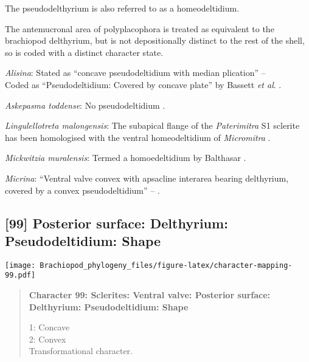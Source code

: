 \documentclass[openany]{book}
\theoremstyle{definition}
\theoremstyle{definition}
\theoremstyle{definition}
\theoremstyle{remark}
\begin{document}
The pseudodelthyrium is also referred to as a homeodeltidium.

The antemucronal area of polyplacophora is treated as equivalent to the
brachiopod delthyrium, but is not depositionally distinct to the rest of
the shell, so is coded with a distinct character state.

\hypertarget{Alisina-coding-98}{}
\emph{Alisina}: Stated as ``concave pseudodeltidium with median
plication'' -- \citet{Williams2000LinguliformeaCraniiformea}\\
Coded as ``Pseudodeltidium: Covered by concave plate'' by Bassett
\emph{et al}. \citeyearpar{Bassett2001Functionalmorphology}.

\hypertarget{Askepasma_toddense-coding-98}{}
\emph{Askepasma toddense}: No pseudodeltidium
\citep[p.~153]{Williams2000LinguliformeaCraniiformea}.

\hypertarget{Lingulellotreta_malongensis-coding-98}{}
\emph{Lingulellotreta malongensis}: The subapical flange of the
\emph{Paterimitra} S1 sclerite has been homologised with the ventral
homeodeltidium of \emph{Micromitra} \citep{Larsson2014iPaterimitra}.

\hypertarget{Mickwitzia_muralensis-coding-98}{}
\emph{Mickwitzia muralensis}: Termed a homoedeltidium by Balthasar
\citeyearpar{Balthasar2004Shellstructure}.

\hypertarget{Micrina-coding-98}{}
\emph{Micrina}: ``Ventral valve convex with apsacline interarea bearing
delthyrium, covered by a convex pseudodeltidium'' --
\citet{Holmer2008TheEarly}.

\subsection*{{[}99{]} Posterior surface: Delthyrium: Pseudodeltidium:
Shape}\label{posterior-surface-delthyrium-pseudodeltidium-shape}

\texttt{[image: Brachiopod\_phylogeny\_files/figure-latex/character-mapping-99.pdf]}

\begin{quote}
\textbf{Character 99: Sclerites: Ventral valve: Posterior surface:
Delthyrium: Pseudodeltidium: Shape}

1: Concave\\
2: Convex\\
Transformational character.
\end{quote}
\end{document}
